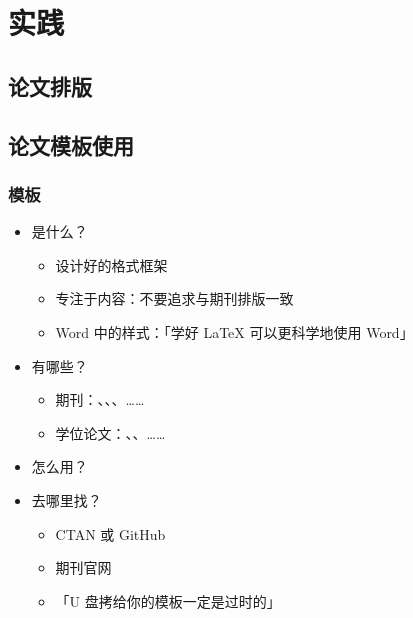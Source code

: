 \section{实践}
\subsection{论文排版}


\subsection{论文模板使用}
\begin{frame}[fragile]
  \frametitle{模板}
  \begin{itemize}
    \item<+-> 是什么？
  
      \begin{itemize}
        \item 设计好的格式框架
        \item 专注于内容：\alert{不要追求与期刊排版一致}
        \item Word 中的样式：「学好 \LaTeX{} 可以更科学地使用 Word」
      \end{itemize}
  
    \item<+-> 有哪些？
  
      \begin{itemize}
        \item 期刊：、、、……
        \item 学位论文：、、\alert{}……
      \end{itemize}
  
    \item<+-> 怎么用？
  
  
    \item<+-> 去哪里找？
  
      \begin{itemize}
        \item CTAN  或 GitHub \href{https://github.com}{\faGithub}
        \item 期刊官网
        \item 「U 盘拷给你的模板一定是过时的」
      \end{itemize}
  \end{itemize}
\end{frame}


